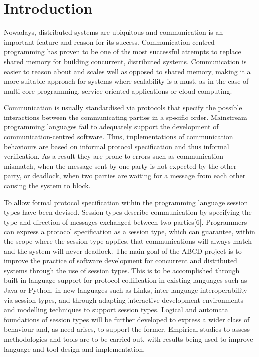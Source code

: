 \section{Introduction}


Nowadays, distributed systems are ubiquitous and communication is an important feature and reason for its success. Communication-centred programming has proven to be one of the most successful attempts to replace shared memory for building concurrent, distributed systems. Communication is easier to reason about and scales well as opposed to shared memory, making it a more suitable approach for systems where scalability is a must, as in the case of multi-core programming, service-oriented applications or cloud computing\cite{abcd}.

Communication is usually standardised via protocols that specify the possible interactions between the communicating parties in a specific order. Mainstream programming languages fail to adequately support the development of communication-centred software. Thus, implementations of communication behaviours are based on informal protocol specification and thus informal verification. As a result they are prone to errors such as communication mismatch, when the message sent by one party is not expected by the other party, or deadlock, when two parties are waiting for a message from each other causing the system to block\cite{abcd}. 

To allow formal protocol specification within the programming language session types have been devised. Session types describe communication by specifying the type and direction of messages exchanged between two parties[6]. Programmers can express a protocol specification as a session type, which can guarantee, within the scope where the session type applies, that communications will always match and the system will never deadlock.
The main goal of the ABCD project\cite{abcd} is to improve the practice of software development for concurrent and distributed systems through the use of session types. This is to be accomplished through built-in language support for protocol codification in existing languages such as Java or Python, in new languages such as Links\cite{abcd}, inter-language interoperability via session types, and through adapting interactive development environments and modelling techniques to support session types. Logical and automata foundations of session types will be further developed to express a wider class of behaviour and, as need arises, to support the former. Empirical studies to assess methodologies and tools are to be carried out, with results being used to improve language and tool design and implementation.

